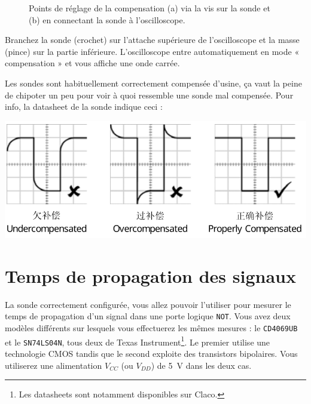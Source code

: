 \documentclass{../template/labo}
\begin{document}
\begin{figure}[!h]
\centering
{}
\hfill
{}
\caption{Points de réglage de la compensation (a) via la vis sur la sonde et (b) en connectant la sonde à l'oscilloscope.}
\label{fig:compensation}
\end{figure}

Branchez la sonde (crochet) sur l'attache supérieure de l'oscilloscope et la masse (pince) sur la partie inférieure.
L'oscilloscope entre automatiquement en mode « compensation » et vous affiche une onde carrée.

{
Les sondes sont habituellement correctement compensée d'usine, ça vaut la peine de chipoter un peu pour voir à quoi ressemble une sonde mal compensée.
Pour info, la datasheet de la sonde indique ceci :

\begin{center}
\includegraphics[width=.8\textwidth]{PV2150-compensation.png}
\end{center}
}






\section{Temps de propagation des signaux}
La sonde correctement configurée, vous allez pouvoir l'utiliser pour mesurer le temps de propagation d'un signal dans une porte logique \texttt{NOT}.
Vous avez deux modèles différents sur lesquels vous effectuerez les mêmes mesures : le \texttt{CD4069UB} et le \texttt{SN74LS04N}, tous deux de Texas Instrument\footnote{Les datasheets sont notamment disponibles sur Claco.}.
Le premier utilise une technologie CMOS tandis que le second exploite des transistors bipolaires.
Vous utiliserez une alimentation $V_{CC}$ (ou $V_{DD}$) de 5~V dans les deux cas.
\end{document}
